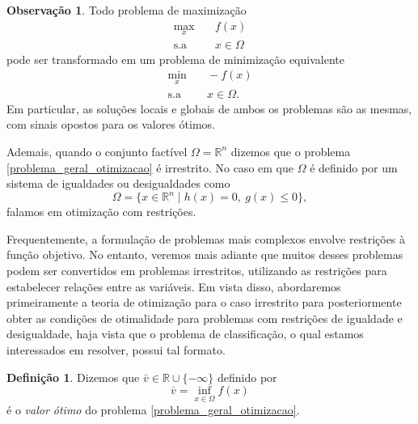 \documentclass[12pt,a4paper]{scrartcl}
\def\RR{\mathds{R}}
\theoremstyle{definition}%
\newtheorem{defi}{Definição}
\newtheorem{obs}{Observação}
\begin{document}
\begin{obs}
Todo problema de maximização
\[
\begin{aligned}
\max_{x} & \quad f(x) \\
\text{s.a} & \quad x \in \Omega \end{aligned}
 \]
pode ser transformado em um problema de minimização equivalente
\[
\begin{aligned}
\min_{x} & \quad -f(x) \\
\text{s.a} & \quad x \in \Omega .\end{aligned}
\]
Em particular, as soluções locais e globais de ambos os problemas são as mesmas, com sinais opostos para os valores ótimos.
\end{obs} %



Ademais, quando o conjunto factível $\Omega = \RR^{n}$ dizemos que o problema \eqref{problema_geral_otimizacao} é irrestrito. No caso em que $\Omega$ é definido por um sistema de igualdades ou desigualdades como
\[
\Omega = \{ x\in \RR^{n} \mid h(x)=0, \ g(x) \leq 0 \},
\]
falamos em otimização com restrições.

Frequentemente, a formulação de problemas mais complexos envolve restrições à função objetivo. No entanto, veremos mais adiante que muitos desses problemas podem ser convertidos em problemas irrestritos, utilizando as restrições para estabelecer relações entre as variáveis. Em vista disso, abordaremos primeiramente a teoria de otimização para o caso irrestrito para posteriormente obter as condições de otimalidade para problemas com restrições de igualdade e desigualdade, haja vista que o problema de classificação, o qual estamos interessados em resolver, possui tal formato.

\begin{defi} \label{defi:valor_otimo}
Dizemos que $\bar{v} \in \RR \cup \{ -\infty \}$ definido por
\[
\bar{v} = \inf_{x \in \Omega} f(x)
\]
é o \emph{valor ótimo} do problema \eqref{problema_geral_otimizacao}.
\end{defi}
\end{document}
